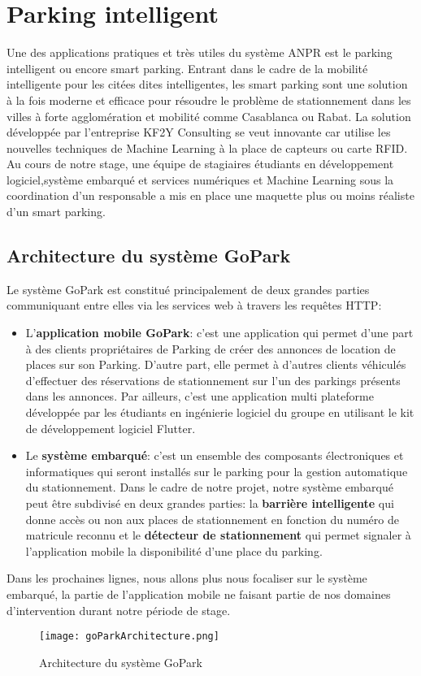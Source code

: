 \section{Parking intelligent}
Une des applications pratiques et très utiles du système ANPR est le parking intelligent ou encore smart parking. Entrant dans le cadre de la mobilité intelligente pour les citées dites intelligentes, les smart parking sont  une solution à la fois moderne et efficace pour résoudre le problème de stationnement dans les villes à forte agglomération et mobilité comme Casablanca ou Rabat. La solution développée par l’entreprise KF2Y Consulting se veut innovante car utilise les nouvelles techniques de Machine Learning à la place de capteurs ou carte RFID. Au cours de notre stage, une équipe de stagiaires étudiants en développement logiciel,système embarqué et services numériques et Machine Learning sous la coordination d’un responsable a mis en place une maquette plus ou moins réaliste d’un smart parking. 

    \subsection{Architecture du système GoPark}
Le système GoPark est constitué principalement de deux grandes parties communiquant entre elles via les services web à travers les requêtes HTTP: 
    \begin{itemize}
        \item L’\textbf{application mobile GoPark}: c’est une application qui permet d’une part à des clients propriétaires de Parking de créer des annonces de location de places sur son Parking. D’autre part, elle permet à d’autres clients véhiculés d’effectuer des réservations de stationnement sur l’un des parkings présents dans les annonces. Par ailleurs, c'est une application multi plateforme développée par les étudiants en ingénierie logiciel du groupe en utilisant le kit de développement logiciel Flutter.
        \item Le \textbf{système embarqué}: c’est un ensemble des composants électroniques et informatiques qui seront installés sur le parking pour la gestion automatique du stationnement. Dans le cadre de notre projet, notre système embarqué peut être subdivisé en deux grandes parties: la \textbf{barrière intelligente} qui donne accès ou non aux places de stationnement en fonction du numéro de matricule reconnu et le \textbf{détecteur de stationnement} qui permet signaler à l'application mobile la disponibilité d'une place du parking.
    \end{itemize}
    Dans les prochaines lignes, nous allons plus nous focaliser sur le système embarqué, la partie de l'application mobile ne faisant partie de nos domaines d'intervention durant notre période de stage. 
    \begin{figure}
        \centering
        \texttt{[image: goParkArchitecture.png]}
        \caption{Architecture du système GoPark}
    \end{figure}


